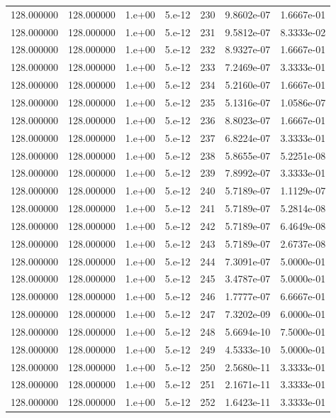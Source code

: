 \begin{table}[htbp]
\begin{tabular}{rrrrrrr}
128.000000 & 128.000000 & 1.e+00 & 5.e-12 & 230 & 9.8602e-07 & 1.6667e-01 \\
128.000000 & 128.000000 & 1.e+00 & 5.e-12 & 231 & 9.5812e-07 & 8.3333e-02 \\
128.000000 & 128.000000 & 1.e+00 & 5.e-12 & 232 & 8.9327e-07 & 1.6667e-01 \\
128.000000 & 128.000000 & 1.e+00 & 5.e-12 & 233 & 7.2469e-07 & 3.3333e-01 \\
128.000000 & 128.000000 & 1.e+00 & 5.e-12 & 234 & 5.2160e-07 & 1.6667e-01 \\
128.000000 & 128.000000 & 1.e+00 & 5.e-12 & 235 & 5.1316e-07 & 1.0586e-07 \\
128.000000 & 128.000000 & 1.e+00 & 5.e-12 & 236 & 8.8023e-07 & 1.6667e-01 \\
128.000000 & 128.000000 & 1.e+00 & 5.e-12 & 237 & 6.8224e-07 & 3.3333e-01 \\
128.000000 & 128.000000 & 1.e+00 & 5.e-12 & 238 & 5.8655e-07 & 5.2251e-08 \\
128.000000 & 128.000000 & 1.e+00 & 5.e-12 & 239 & 7.8992e-07 & 3.3333e-01 \\
128.000000 & 128.000000 & 1.e+00 & 5.e-12 & 240 & 5.7189e-07 & 1.1129e-07 \\
128.000000 & 128.000000 & 1.e+00 & 5.e-12 & 241 & 5.7189e-07 & 5.2814e-08 \\
128.000000 & 128.000000 & 1.e+00 & 5.e-12 & 242 & 5.7189e-07 & 6.4649e-08 \\
128.000000 & 128.000000 & 1.e+00 & 5.e-12 & 243 & 5.7189e-07 & 2.6737e-08 \\
128.000000 & 128.000000 & 1.e+00 & 5.e-12 & 244 & 7.3091e-07 & 5.0000e-01 \\
128.000000 & 128.000000 & 1.e+00 & 5.e-12 & 245 & 3.4787e-07 & 5.0000e-01 \\
128.000000 & 128.000000 & 1.e+00 & 5.e-12 & 246 & 1.7777e-07 & 6.6667e-01 \\
128.000000 & 128.000000 & 1.e+00 & 5.e-12 & 247 & 7.3202e-09 & 6.0000e-01 \\
128.000000 & 128.000000 & 1.e+00 & 5.e-12 & 248 & 5.6694e-10 & 7.5000e-01 \\
128.000000 & 128.000000 & 1.e+00 & 5.e-12 & 249 & 4.5333e-10 & 5.0000e-01 \\
128.000000 & 128.000000 & 1.e+00 & 5.e-12 & 250 & 2.5680e-11 & 3.3333e-01 \\
128.000000 & 128.000000 & 1.e+00 & 5.e-12 & 251 & 2.1671e-11 & 3.3333e-01 \\
128.000000 & 128.000000 & 1.e+00 & 5.e-12 & 252 & 1.6423e-11 & 3.3333e-01 \\

\end{tabular}
\end{table}
